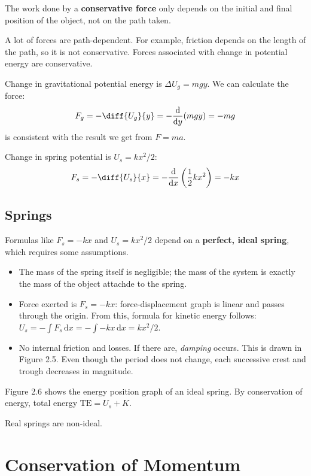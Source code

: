 \documentclass{article}
\newcommand{\definition}[1]{\begin{tcolorbox}[colback=red!5!white,colframe=red!75!black,parbox=false] #1 \end{tcolorbox}}
\newcommand{\example}[2]{\begin{tcolorbox}[title={Example: #1},colback=brown!5!white,colframe=brown!75!black,parbox=false] #2 \end{tcolorbox}}
\newcommand*{\deriv}[1][x]{\ensuremath{\dfrac{\mathrm{d}}{\mathrm{d}#1}}}
\begin{document}
\definition{The work done by a \textbf{conservative force} only depends on the initial and final position of the object, not on the path taken.}

A lot of forces are path-dependent. For example, friction depends on the length of the path, so it is not conservative. Forces associated with change in potential energy are conservative.

\example{Gravitional potential}{
	Change in gravitational potential energy is $\Delta U_g=mgy$. We can calculate the force:
	\begin{equation*}
		F_g=-\diff{U_g}{y}=-\deriv[y](mgy)=-mg
	\end{equation*}
	is consistent with the result we get from $F=ma$.
}

\example{Spring potential}{
	Change in spring potential is $U_s=kx^2/2$:
	\begin{equation*}
		F_s=-\diff{U_s}{x}=-\deriv[x]\left(\frac12kx^2\right)=-kx
	\end{equation*}
}

\subsection{Springs}

Formulas like $F_s=-kx$ and $U_s=kx^2/2$ depend on a \textbf{perfect, ideal spring}, which requires some assumptions.
\begin{itemize}
	\item The mass of the spring itself is negligible; the mass of the system is exactly the mass of the object attachde to the spring.
	\item Force exerted is $F_s=-kx$: force-displacement graph is linear and passes through the origin. From this, formula for kinetic energy follows: $U_s=-\int F_s\,\mathrm{d}x=-\int -kx\,\mathrm{d}x=kx^2/2$.
	\item No internal friction and losses. If there are, \textit{damping} occurs. This is drawn in Figure 2.5. Even though the period does not change, each successive crest and trough decreases in magnitude.
\end{itemize}

Figure 2.6 shows the energy position graph of an ideal spring. By conservation of energy, total energy $\text{TE}=U_s+K$.

Real springs are non-ideal.

\section{Conservation of Momentum}
\label{sec:momentum}
\end{document}
